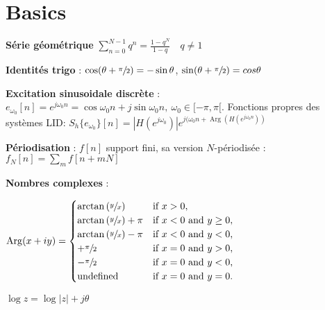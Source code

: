 \section{Basics}

\textbf{Série géométrique} $\sum_{n=0}^{N-1} q^n = \frac{1-q^N}{1-q} \quad q \neq 1$ 

\textbf{Identités trigo} : $\cos(\theta + \sfrac{\pi}{2}) = -\sin\theta$, $\sin(\theta + \sfrac{\pi}{2}) = cos\theta$

\textbf{Excitation sinusoidale discrète} : $e_{\omega_0}[n] = e^{j\omega_0 n} = \cos\omega_0n + j \sin\omega_0n, \:\omega_0\in[-\pi,\pi[$. Fonctions propres des systèmes LID: $S_h\{e_{\omega_0}\}[n] = |H(e^{j\omega_0})| e^{j(\omega_0n + \operatorname{Arg}(H(e^{j\omega_0n}))}$

\textbf{Périodisation} : $f[n]$ support fini, sa version $N$-périodisée : $f_N[n] = \sum_m f[n+mN]$

\textbf{Nombres complexes} : \\
\begin{myitemize}
\item 
$
    \operatorname{Arg}(x + iy) =
\begin{cases}
  \arctan\left(\sfrac y x\right)       &\text{if } x > 0, \\
  \arctan\left(\sfrac y x\right) + \pi &\text{if } x < 0 \text{ and } y \ge 0, \\
  \arctan\left(\sfrac y x\right) - \pi &\text{if } x < 0 \text{ and } y < 0, \\
  +\sfrac{\pi}{2}   &\text{if } x = 0 \text{ and } y > 0, \\
  -\sfrac{\pi}{2}   &\text{if } x = 0 \text{ and } y < 0, \\
  \text{undefined} &\text{if } x = 0 \text{ and } y = 0.
\end{cases}
$

\item $\log z = \log |z| + j\theta$

\end{myitemize}
